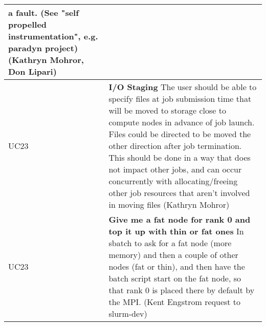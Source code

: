 \begin{longtable}{|p{1cm}|p{15cm}|}
	a fault. (See "self propelled instrumentation", e.g. paradyn project)
	(Kathryn Mohror, Don Lipari)\\
  \hline
  UC23 & \textbf{I/O Staging}\newline
	The user should be able to specify files at job submission time that
	will be moved to storage close to compute nodes in advance of job
	launch. Files could be directed to be moved the other direction
	after job termination. This should be done in a way that does not
	impact other jobs, and can occur concurrently with allocating/freeing
	other job resources that aren't involved in moving files (Kathryn
	Mohror)\\
  \hline
  UC23 & \textbf{Give me a fat node for rank 0 and top it up with thin or fat ones}\newline
	In sbatch to ask for a fat node (more memory) and then a couple of
	other nodes (fat or thin), and then have the batch script start on
	the fat node, so that rank 0 is placed there by default by the MPI.
	(Kent Engstrom request to slurm-dev)\\
  \hline
\end{longtable}
